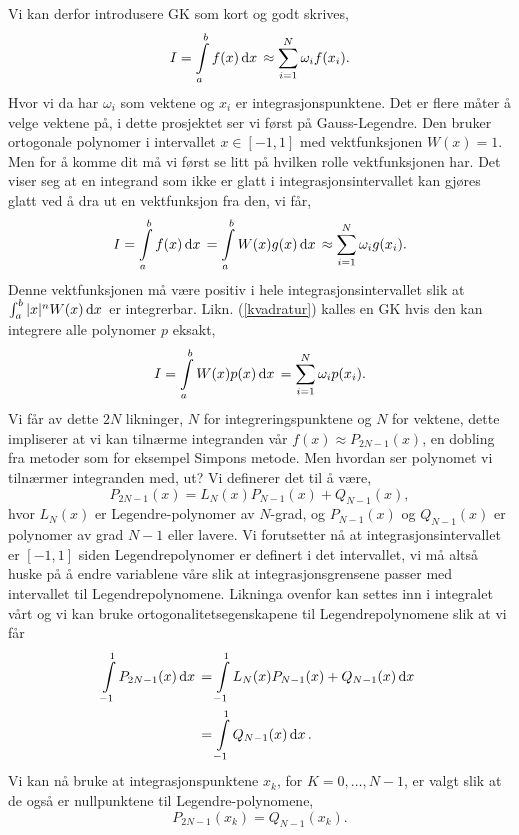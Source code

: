 \documentclass[norsk, 10pt,twocolumn]{article}
\newcommand{\dx}{\, {\rm d}x\, }
\begin{document}
Vi kan derfor introdusere GK som kort og godt skrives,
\begin{equation}
	I = \int\limits_{a}^b f(x) \dx \approx \sum\limits_{i=1}^N \omega_i f(x_i).
\end{equation}
Hvor vi da har $\omega_i$ som vektene og $x_i$ er integrasjonspunktene. Det er flere måter å velge vektene på, i dette prosjektet ser vi først på Gauss-Legendre. Den bruker ortogonale polynomer i intervallet $x\in[-1,1]$ med vektfunksjonen $W(x) = 1$. Men for å komme dit må vi først se litt på hvilken rolle vektfunksjonen har. Det viser seg at en integrand som ikke er glatt i integrasjonsintervallet kan gjøres glatt ved å dra ut en vektfunksjon fra den, vi får,
\begin{align}
	I = \int\limits_{a}^b f(x) \dx = \int\limits_{a}^b W(x)g(x) \dx \approx \sum\limits_{i=1}^N \omega_i g(x_i). \label{kvadratur}
\end{align}
Denne vektfunksjonen må  være positiv i hele integrasjonsintervallet slik at $\int_a^b |x|^n W(x)\dx$ er integrerbar. Likn. (\ref{kvadratur}) kalles en GK hvis den kan integrere alle polynomer $p$ eksakt,
$$ 	I = \int\limits_{a}^b W(x)p(x) \dx = \sum\limits_{i=1}^N \omega_i p(x_i). $$
Vi får av dette $2N$ likninger, $N$ for integreringspunktene og $N$ for vektene, dette impliserer at vi kan tilnærme integranden vår $f(x) \approx P_{2N-1}(x)$, en dobling fra metoder som for eksempel Simpons metode. Men hvordan ser polynomet vi tilnærmer integranden med, ut? Vi definerer det til å være,
\begin{equation}
	P_{2N-1} (x) = L_N(x)P_{N-1}(x) + Q_{N-1}(x),
\end{equation}
hvor $L_N(x)$ er Legendre-polynomer av $N$-grad, og $P_{N-1}(x)$ og $Q_{N-1}(x)$ er polynomer av grad $N-1$ eller lavere. Vi forutsetter nå at integrasjonsintervallet er $[-1,1]$ siden Legendrepolynomer er definert i det intervallet, vi må altså huske på å endre variablene våre slik at integrasjonsgrensene passer med intervallet til Legendrepolynomene. Likninga ovenfor kan settes inn i integralet vårt og vi kan bruke ortogonalitetsegenskapene til Legendrepolynomene slik at vi får
\begin{align*}
	\int\limits_{-1}^1 P_{2N-1} (x) \dx &= \int\limits_{-1}^1L_N(x)P_{N-1}(x)+Q_{N-1}(x)\dx\\
	&= \int\limits_{-1}^1  Q_{N-1}(x) \dx.
\end{align*}
Vi kan nå bruke at integrasjonspunktene $x_k$, for $K=0,\ldots,N-1$, er valgt slik at de også er nullpunktene til Legendre-polynomene,
$$ P_{2N-1} (x_k) = Q_{N-1}(x_k). $$
\end{document}
